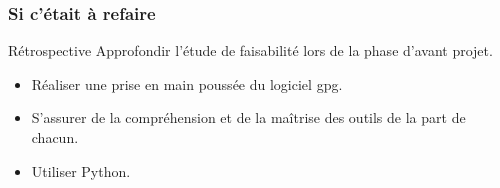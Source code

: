   \begin{frame}
  \frametitle{\color{white}Si c'était à refaire}
    \begin{block}{Rétrospective}
    Approfondir l'étude de faisabilité lors de la phase d'avant projet.
      \begin{itemize}
        \item Réaliser une prise en main poussée du logiciel gpg.
        \item S'assurer de la compréhension et de la maîtrise des outils de la part de chacun.
        \item Utiliser Python.
      \end{itemize}
    \end{block}


  \end{frame}
